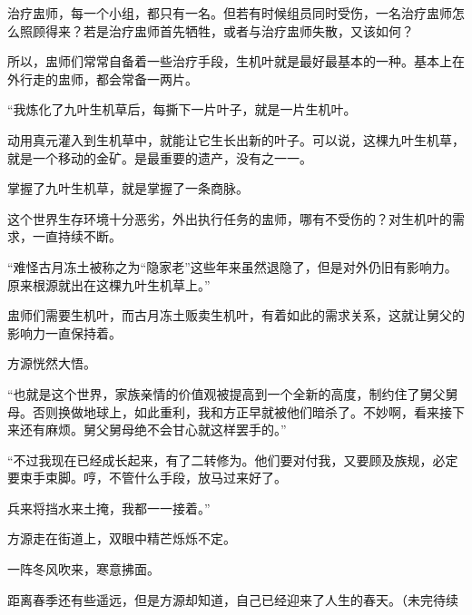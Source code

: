 \begin{this_body}
治疗盅师，每一个小组，都只有一名。但若有时候组员同时受伤，一名治疗盅师怎么照顾得来？若是治疗盅师首先牺牲，或者与治疗盅师失散，又该如何？

所以，盅师们常常自备着一些治疗手段，生机叶就是最好最基本的一种。基本上在外行走的盅师，都会常备一两片。

“我炼化了九叶生机草后，每撕下一片叶子，就是一片生机叶。

动用真元灌入到生机草中，就能让它生长出新的叶子。可以说，这棵九叶生机草，就是一个移动的金矿。是最重要的遗产，没有之一一。

掌握了九叶生机草，就是掌握了一条商脉。

这个世界生存环境十分恶劣，外出执行任务的盅师，哪有不受伤的？对生机叶的需求，一直持续不断。

“难怪古月冻土被称之为“隐家老”这些年来虽然退隐了，但是对外仍旧有影响力。原来根源就出在这棵九叶生机草上。”

盅师们需要生机叶，而古月冻土贩卖生机叶，有着如此的需求关系，这就让舅父的影响力一直保持着。

方源恍然大悟。

“也就是这个世界，家族亲情的价值观被提高到一个全新的高度，制约住了舅父舅母。否则换做地球上，如此重利，我和方正早就被他们暗杀了。不妙啊，看来接下来还有麻烦。舅父舅母绝不会甘心就这样罢手的。”

“不过我现在已经成长起来，有了二转修为。他们要对付我，又要顾及族规，必定要束手束脚。哼，不管什么手段，放马过来好了。

兵来将挡水来土掩，我都一一接着。”

方源走在街道上，双眼中精芒烁烁不定。

一阵冬风吹来，寒意拂面。

距离春季还有些遥远，但是方源却知道，自己已经迎来了人生的春天。（未完待续

\end{this_body}

